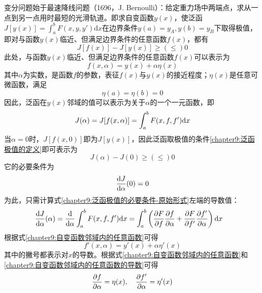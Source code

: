 变分问题始于最速降线问题（1696，J. Bernoulli）：给定重力场中两端点，求从一点到另一点用时最短的光滑轨道。即求自变函数$y(x)$，使泛函$\displaystyle J[y(x)] = \int_a^b F(x,y,y') \mathrm{d} x$在边界条件$y(a) = y_A,y(b) = y_B$下取得极值，即对与函数$y(x)$临近、但满足边界条件的任意函数$f(x)$，都有
\begin{equation}
	J[f(x)]-J[y(x)]\geqslant(\leqslant) 0
	\label{chapter9:泛函极值的定义}
\end{equation}
此处，与函数$y(x)$临近、但满足边界条件的任意函数$f(x)$可以表示为
\begin{equation}
	f(x,\alpha) = y(x)+\alpha\eta(x)
	\label{chapter9:自变函数邻域内的任意函数}
\end{equation}
其中$\alpha$为实数，是函数$f$的参数，表征$f(x)$与$y(x)$的接近程度；$\eta(x)$是任意可微函数，满足
\begin{equation}
	\eta(a)=\eta(b)=0
	\label{chapter9:任意函数的固定边界条件}
\end{equation}
因此，泛函在$y(x)$邻域的值可以表示为关于$\alpha$的一个一元函数，即
\begin{equation}
	J(\alpha)=J[f(x,\alpha)] = \int_a^b F(x,f,f')\mathrm{d} x
	\label{chapter9:将泛函转化为关于自变函数参数的一元函数}
\end{equation}
当$\alpha=0$时，$J[f(x,0)]$即为$J[y(x)]$，因此泛函取极值的条件\eqref{chapter9:泛函极值的定义}即可表示为
\begin{equation}
	J(\alpha)-J(0)\geqslant(\leqslant) 0
\end{equation}
它的必要条件为
\begin{equation}
	\dfrac{\mathrm{d} J}{\mathrm{d} \alpha}(0) = 0
	\label{chapter9:泛函极值的必要条件-原始形式}
\end{equation}
为此，只需计算式\eqref{chapter9:泛函极值的必要条件-原始形式}左端的导数值：
\begin{align}
	\dfrac{\mathrm{d} J}{\mathrm{d} \alpha}(\alpha) & = \dfrac{\mathrm{d}}{\mathrm{d} \alpha}\int_a^b F(x,f,f')\mathrm{d} x = \int_a^b\left(\frac{\partial F}{\partial f}\frac{\partial f}{\partial \alpha} + \frac{\partial F}{\partial f'}\frac{\partial f'}{\partial \alpha}\right)\mathrm{d} x
	\label{chapter9:泛函对参数的导数-初步}
\end{align}
根据式\eqref{chapter9:自变函数邻域内的任意函数}可得
\begin{equation}
	f'(x,\alpha) = y'(x)+\alpha\eta'(x)
	\label{chapter9:自变函数邻域内的任意函数的导数}
\end{equation}
其中的撇号都表示对$x$的导数。根据式\eqref{chapter9:自变函数邻域内的任意函数}和\eqref{chapter9:自变函数邻域内的任意函数的导数}可得
\begin{equation}
	\frac{\partial f}{\partial \alpha} = \eta(x),\quad \frac{\partial f'}{\partial \alpha} = \eta'(x)
	\label{chapter9:自变函数邻域内的任意函数的导数-导出式}
\end{equation}
